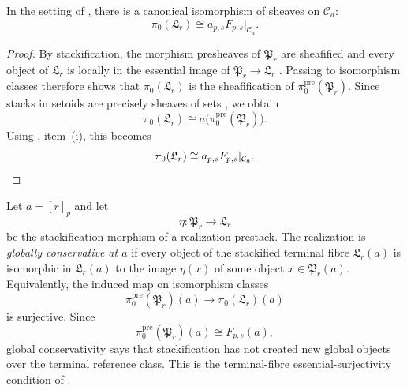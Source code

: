 \begin{proposition}\label{prop:stackification-components}
In the setting of , there is a canonical isomorphism of sheaves on $\mathcal C_a$:
\[
\pi_0(\mathfrak L_r)\cong a_{p,s}F_{p,s}|_{\mathcal C_a}.
\]
\end{proposition}

\begin{proof}
By stackification, the morphism presheaves of $\mathfrak P_r$ are sheafified and every object of $\mathfrak L_r$ is locally in the essential image of $\mathfrak P_r\to \mathfrak L_r$ \cite[Tag 02ZP]{StacksProject}. Passing to isomorphism classes therefore shows that $\pi_0(\mathfrak L_r)$ is the sheafification of $\pi_0^{\mathrm{pre}}(\mathfrak P_r)$. Since stacks in setoids are precisely sheaves of sets \cite[Tag 042Y]{StacksProject}, we obtain
\[
\pi_0(\mathfrak L_r)\cong a\bigl(\pi_0^{\mathrm{pre}}(\mathfrak P_r)\bigr).
\]
Using , item~\textup{(i)}, this becomes
\[
\pi_0(\mathfrak L_r)\cong a_{p,s}F_{p,s}|_{\mathcal C_a}.
\qedhere
\]
\end{proof}

\begin{definition}\label{def:global-conservativity}
Let $a=[r]_p$ and let
\[
\eta:\mathfrak P_r\longrightarrow \mathfrak L_r
\]
be the stackification morphism of a realization prestack. The realization is
\emph{globally conservative at $a$} if every object of the stackified terminal
fibre $\mathfrak L_r(a)$ is isomorphic in $\mathfrak L_r(a)$ to the image
$\eta(x)$ of some object $x\in\mathfrak P_r(a)$. Equivalently, the induced map
on isomorphism classes
\[
\pi_0^{\mathrm{pre}}(\mathfrak P_r)(a)\longrightarrow \pi_0(\mathfrak L_r)(a)
\]
is surjective. Since
\[
\pi_0^{\mathrm{pre}}(\mathfrak P_r)(a)\cong F_{p,s}(a),
\]
global conservativity says that stackification has not created new global
objects over the terminal reference class. This is the terminal-fibre
essential-surjectivity condition of
\cite[Definition~4.15]{HomologicalVisibilityGluingObstructions2026}.
\end{definition}


